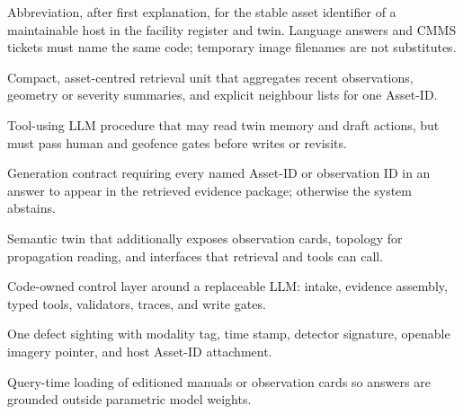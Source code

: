 

Abbreviation, after first explanation, for the stable asset identifier of a maintainable host in the facility register and twin. Language answers and CMMS tickets must name the same code; temporary image filenames are not substitutes.

Compact, asset-centred retrieval unit that aggregates recent observations, geometry or severity summaries, and explicit neighbour lists for one Asset-ID.

Tool-using LLM procedure that may read twin memory and draft actions, but must pass human and geofence gates before writes or revisits.

Generation contract requiring every named Asset-ID or observation ID in an answer to appear in the retrieved evidence package; otherwise the system abstains.

Semantic twin that additionally exposes observation cards, topology for propagation reading, and interfaces that retrieval and tools can call.

Code-owned control layer around a replaceable LLM: intake, evidence assembly, typed tools, validators, traces, and write gates.

One defect sighting with modality tag, time stamp, detector signature, openable imagery pointer, and host Asset-ID attachment.

Query-time loading of editioned manuals or observation cards so answers are grounded outside parametric model weights.
